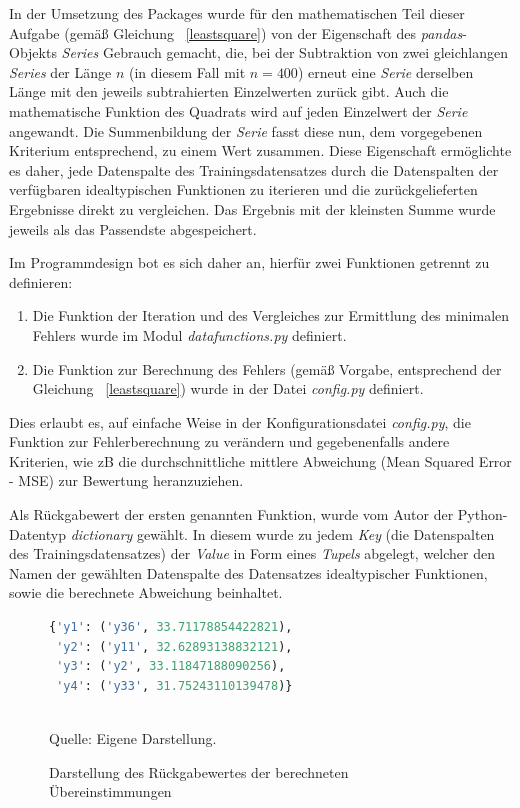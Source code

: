 In der Umsetzung des Packages wurde für den mathematischen Teil dieser Aufgabe (gemäß Gleichung ~\ref{leastsquare})  von der Eigenschaft des \emph{pandas}-Objekts \emph{Series} Gebrauch gemacht, die, bei der Subtraktion von zwei gleichlangen \emph{Series} der Länge $n$ (in diesem Fall mit $n=400$) erneut eine \emph{Serie} derselben Länge mit den jeweils subtrahierten Einzelwerten zurück gibt. Auch die mathematische Funktion des Quadrats wird auf jeden Einzelwert der \emph{Serie} angewandt. Die Summenbildung der \emph{Serie} fasst diese nun, dem vorgegebenen Kriterium entsprechend, zu einem Wert zusammen.
Diese Eigenschaft ermöglichte es daher, jede Datenspalte des Trainingsdatensatzes durch die Datenspalten der verfügbaren idealtypischen Funktionen zu iterieren und die zurückgelieferten Ergebnisse direkt zu vergleichen. Das Ergebnis mit der kleinsten Summe wurde jeweils als das Passendste abgespeichert.

Im Programmdesign bot es sich daher an, hierfür zwei Funktionen getrennt zu definieren:
\begin{enumerate}
 \itemsep0pt
 \item Die Funktion der Iteration und des Vergleiches zur Ermittlung des minimalen Fehlers wurde im Modul \emph{datafunctions.py} definiert.
 \item Die Funktion zur Berechnung des Fehlers (gemäß Vorgabe, entsprechend der Gleichung ~\ref{leastsquare}) wurde in der Datei \emph{config.py} definiert.
\end{enumerate}

Dies erlaubt es, auf einfache Weise in der Konfigurationsdatei \emph{config.py}, die Funktion zur Fehlerberechnung zu verändern und gegebenenfalls andere Kriterien, wie zB die durchschnittliche mittlere Abweichung (Mean Squared Error - MSE) zur Bewertung heranzuziehen. 

Als Rückgabewert der ersten genannten Funktion, wurde vom Autor der Python-Datentyp \emph{dictionary} gewählt. In diesem wurde zu jedem \emph{Key} (die Datenspalten des Trainingsdatensatzes) der \emph{Value} in Form eines \emph{Tupels} abgelegt, welcher den Namen der gewählten Datenspalte des Datensatzes idealtypischer Funktionen, sowie die berechnete Abweichung beinhaltet.

\begin{figure}[h]
\caption{Darstellung des Rückgabewertes der berechneten Übereinstimmungen}
\begin{tabular} 
\begin{lstlisting}[language=python,
				   label=dictresult]
{'y1': ('y36', 33.71178854422821),
 'y2': ('y11', 32.62893138832121),
 'y3': ('y2', 33.11847188090256),
 'y4': ('y33', 31.75243110139478)}
\end{lstlisting}
\end{tabular}\\
\centering
Quelle: Eigene Darstellung.
\label{fig:resultdict}
\end{figure}

